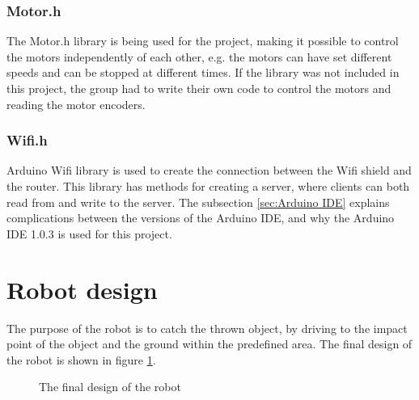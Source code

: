 \subsubsection{Motor.h}
\label{sec:Motor.h}
The Motor.h library is being used for the project, making it possible to control the motors independently of each other, e.g. the motors can have set different speeds and can be stopped at different times. If the library was not included in this project, the group had to write their own code to control the motors and reading the motor encoders. 

\subsubsection{Wifi.h}
\label{sec:Wifi.h}
Arduino Wifi library is used to create the connection between the Wifi shield and the router. This library has methods for creating a server, where clients can both read from and write to the server. The subsection \ref{sec:Arduino IDE} explains complications between the versions of the Arduino IDE, and why the Arduino IDE 1.0.3 is used for this project.

\section{Robot design}
\label{sec:Robot design}
The purpose of the robot is to catch the thrown object, by driving to the impact point of the object and the ground within the predefined area. The final design of the robot is shown in figure \ref{robot}.

\begin{figure}[h]
	\centering
	\caption{The final design of the robot}
	\label{robot}
\end{figure}

